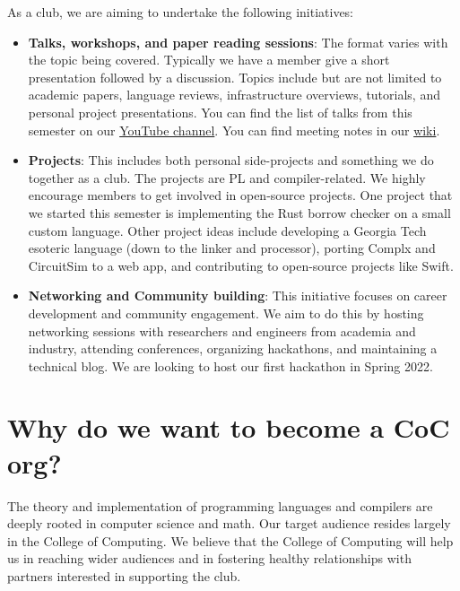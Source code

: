 \documentclass[12pt]{article}
\begin{document}
As a club, we are aiming to undertake the following initiatives:
\begin{itemize}
\item
  {
    \textbf{Talks, workshops, and paper reading sessions}: The format varies with the topic being covered. Typically we have a member give a short presentation followed by a discussion. Topics include but are not limited to academic papers, language reviews, infrastructure overviews, tutorials, and personal project presentations. You can find the list of talks from this semester on our \href{https://www.youtube.com/channel/UCjHdGaeMl9vej0l5CGjkYmg}{YouTube channel}. You can find meeting notes in our \href{https://dtyped-wiki.netlify.app/meetings/}{wiki}.
  }
\item
  {
    \textbf{Projects}: This includes both personal side-projects and something we do together as a club. The projects are PL and compiler-related. We highly encourage members to get involved in open-source projects. One project that we started this semester is implementing the Rust borrow checker on a small custom language. Other project ideas include developing a Georgia Tech esoteric language (down to the linker and processor), porting Complx and CircuitSim to a web app, and contributing to open-source projects like Swift.
  }
\item
  {
    \textbf{Networking and Community building}: This initiative focuses on career development and community engagement. We aim to do this by hosting networking sessions with researchers and engineers from academia and industry, attending conferences, organizing hackathons, and  maintaining a technical blog. We are looking to host our first hackathon in Spring 2022.
  }
\end{itemize}


\section{Why do we want to become a CoC org?} \label{sec:why_coc}

The theory and implementation of programming languages and compilers are deeply rooted in computer science and math. Our target audience resides largely in the College of Computing. We believe that the College of Computing will help us in reaching wider audiences and in fostering healthy relationships with partners interested in supporting the club.
\end{document}
